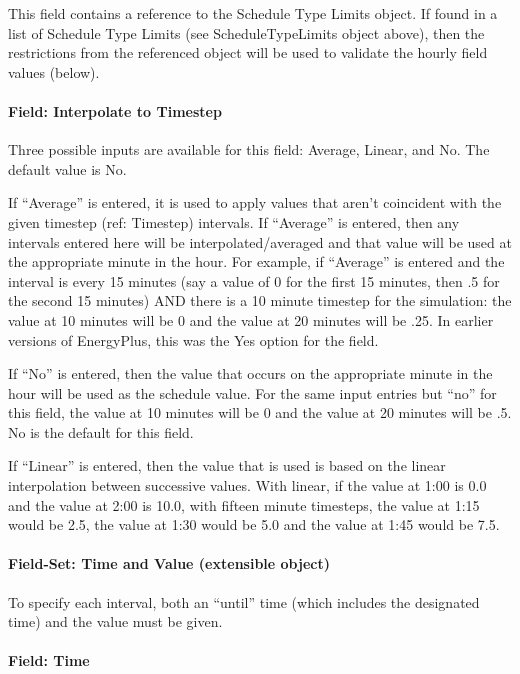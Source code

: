 This field contains a reference to the Schedule Type Limits object. If found in a list of Schedule Type Limits (see ScheduleTypeLimits object above), then the restrictions from the referenced object will be used to validate the hourly field values (below).

\paragraph{Field: Interpolate to Timestep}\label{field-interpolate-to-timestep}

Three possible inputs are available for this field: Average, Linear, and No. The default value is No.

If ``Average'' is entered, it is used to apply values that aren't coincident with the given timestep (ref: Timestep) intervals. If ``Average'' is entered, then any intervals entered here will be interpolated/averaged and that value will be used at the appropriate minute in the hour. For example, if ``Average'' is entered and the interval is every 15 minutes (say a value of 0 for the first 15 minutes, then .5 for the second 15 minutes) AND there is a 10 minute timestep for the simulation: the value at 10 minutes will be 0 and the value at 20 minutes will be .25. In earlier versions of EnergyPlus, this was the Yes option for the field.

If ``No'' is entered, then the value that occurs on the appropriate minute in the hour will be used as the schedule value. For the same input entries but ``no'' for this field, the value at 10 minutes will be 0 and the value at 20 minutes will be .5. No is the default for this field.

If ``Linear'' is entered, then the value that is used is based on the linear interpolation between successive values. With linear, if the value at 1:00 is 0.0 and the value at 2:00 is 10.0, with fifteen minute timesteps, the value at 1:15 would be 2.5, the value at 1:30 would be 5.0 and the value at 1:45 would be 7.5. 

\paragraph{Field-Set: Time and Value (extensible object)}\label{field-set-time-and-value-extensible-object}

To specify each interval, both an ``until'' time (which includes the designated time) and the value must be given.

\paragraph{Field: Time}\label{field-time}

